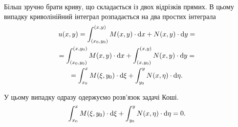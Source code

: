 Більш зручно брати криву, що складається із двох відрізків прямих. В цьому випадку криволінійний інтеграл розпадається на два простих інтеграла
\begin{multline}
	u(x, y) = \int_{(x_0, y_0)}^{(x,y)} M(x,y) \cdot \mathop{}\!\mathrm{d} x + N(x, y) \cdot \mathop{}\!\mathrm{d} y = \\
	= \int_{(x_0, y_0)}^{(x,y_0)} M(x,y) \cdot \mathop{}\!\mathrm{d} x + \int_{(x,y_0)}^{(x,y)} N(x, y) \cdot \mathop{}\!\mathrm{d} y = \\
	= \int_{x_0}^{x} M(\xi,y_0) \cdot \mathop{}\!\mathrm{d} \xi + \int_{y_0}^{y} N(x, \eta) \cdot \mathop{}\!\mathrm{d} \eta.
\end{multline}

У цьому випадку одразу одержуємо розв'язок задачі Коші.
\begin{equation*}
	\int_{x_0}^{x} M(\xi,y_0) \cdot \mathop{}\!\mathrm{d} \xi + \int_{y_0}^{y} N(x, \eta) \cdot \mathop{}\!\mathrm{d} \eta = 0.
\end{equation*}
